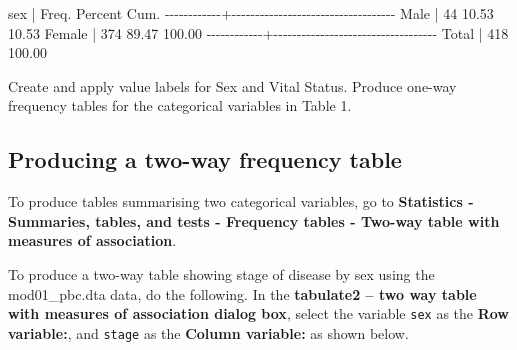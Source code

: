 \documentclass[
  a4paper,
]{memoir}
\newenvironment{Shaded}{\begin{snugshade}}{\end{snugshade}}
\newcommand{\DecValTok}[1]{\textcolor[rgb]{0.00,0.00,0.00}{#1}}
\newcommand{\FloatTok}[1]{\textcolor[rgb]{0.00,0.00,0.00}{#1}}
\newcommand{\NormalTok}[1]{\textcolor[rgb]{0.00,0.00,0.00}{#1}}
\newcommand{\SpecialCharTok}[1]{\textcolor[rgb]{0.00,0.00,0.00}{#1}}
\begin{document}
\begin{Shaded}
\begin{Highlighting}[]
\NormalTok{        sex }\SpecialCharTok{|}\NormalTok{      Freq.     Percent        Cum.}
\SpecialCharTok{{-}{-}{-}{-}{-}{-}{-}{-}{-}{-}{-}{-}+{-}{-}{-}{-}{-}{-}{-}{-}{-}{-}{-}{-}{-}{-}{-}{-}{-}{-}{-}{-}{-}{-}{-}{-}{-}{-}{-}{-}{-}{-}{-}{-}{-}{-}{-}}
\NormalTok{       Male }\SpecialCharTok{|}         \DecValTok{44}       \FloatTok{10.53}       \FloatTok{10.53}
\NormalTok{     Female }\SpecialCharTok{|}        \DecValTok{374}       \FloatTok{89.47}      \FloatTok{100.00}
\SpecialCharTok{{-}{-}{-}{-}{-}{-}{-}{-}{-}{-}{-}{-}+{-}{-}{-}{-}{-}{-}{-}{-}{-}{-}{-}{-}{-}{-}{-}{-}{-}{-}{-}{-}{-}{-}{-}{-}{-}{-}{-}{-}{-}{-}{-}{-}{-}{-}{-}}
\NormalTok{      Total }\SpecialCharTok{|}        \DecValTok{418}      \FloatTok{100.00}
\end{Highlighting}
\end{Shaded}

\begin{tcolorbox}[enhanced jigsaw, title={TASK}, opacitybacktitle=0.6, colbacktitle=quarto-callout-note-color!10!white, titlerule=0mm, colframe=quarto-callout-note-color-frame, opacityback=0, left=2mm, breakable, bottomtitle=1mm, coltitle=black, bottomrule=.15mm, arc=.35mm, rightrule=.15mm, toptitle=1mm, colback=white, toprule=.15mm, leftrule=.75mm]

Create and apply value labels for Sex and Vital Status. Produce one-way
frequency tables for the categorical variables in Table 1.

\end{tcolorbox}

\hypertarget{producing-a-two-way-frequency-table}{%
\subsection{Producing a two-way frequency
table}\label{producing-a-two-way-frequency-table}}

To produce tables summarising two categorical variables, go to
\textbf{Statistics - Summaries, tables, and tests - Frequency tables -
Two-way table with measures of association}.

To produce a two-way table showing stage of disease by sex using the
mod01\_pbc.dta data, do the following. In the \textbf{tabulate2 -- two
way table with measures of association dialog box}, select the variable
\texttt{sex} as the \textbf{Row variable:}, and \texttt{stage} as the
\textbf{Column variable:} as shown below.
\end{document}
